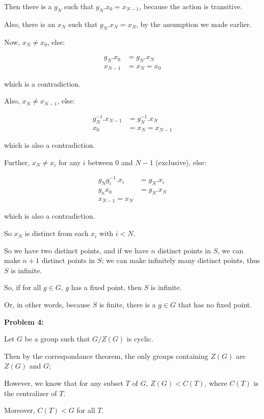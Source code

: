 \documentclass[a4paper,12pt]{article}
\newcommand{\tab}{\hspace{4mm}} %
\newcommand{\shunt}{\vspace{20mm}}
\begin{document}
\tab Then there is a $g_N$ such that $g_N.x_0 = x_{N-1}$, because the action is transitive.

\tab Also, there is an $x_N$ such that $g_N.x_N = x_N$, by the assumption we made earlier.

\tab Now, $x_N \neq x_0$, else:

\begin{align*}
g_N.x_0 &= g_N.x_N\\
x_{N-1}&= x_N=x_0
\end{align*}

\tab which is a contradiction.

\tab Also, $x_N \neq x_{N-1}$, else:

\begin{align*}
g_N^{-1}.x_{N-1} &= g_N^{-1}.x_N\\
x_0&= x_N=x_{N-1}
\end{align*} 

\tab which is also a contradiction.

\tab Further, $x_N \neq x_{i}$ for any $i$ between $0$ and $N-1$ (exclusive), else:

\begin{align*}
g_Ng_i^{-1}.x_i &= g_N.x_i\\
g_nx_0 &= g_N.x_N\\
x_{N-1} = x_N
\end{align*} 

\tab which is also a contradiction.

\tab So $x_N$ is distinct from each $x_i$ with $i < N$.

\tab So we have two distinct points, and if we have $n$ distinct points in $S$, we can make $n+1$ distinct points in $S$; we can make infinitely many distinct points, thus $S$ is infinite.

So, if for all $g \in G$, $g$ has a fixed point, then $S$ is infinite.

Or, in other words, because $S$ is finite, there is a $g \in G$ that has no fixed point.

\shunt

{\bf Problem 4:}

Let $G$ be a group such that $G/Z(G)$ is cyclic.

Then by the correspondance theorem, the only groups containing $Z(G)$ are $Z(G)$ and $G$; %

However, we know that for any subset $T$ of $G$, $Z(G) < C(T)$, where $C(T)$ is the centralizer of $T$.

Moreover, $C(T) < G$ for all $T$.
\end{document}
